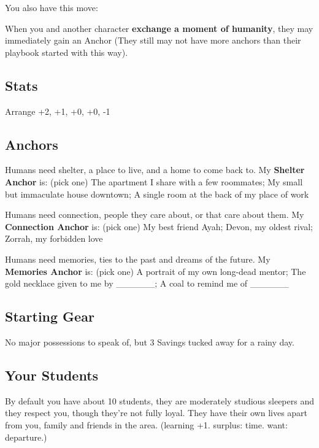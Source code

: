 \documentclass[
  oneside,
  statementpaper,
  9pt]{memoir}
\begin{document}
You also have this move:

When you and another character \textbf{exchange a moment of humanity},
they may immediately gain an Anchor (They still may not have more
anchors than their playbook started with this way).

\hypertarget{stats-4}{%
\subsection{Stats}\label{stats-4}}

Arrange +2, +1, +0, +0, -1

\hypertarget{anchors-3}{%
\subsection{Anchors}\label{anchors-3}}

Humans need shelter, a place to live, and a home to come back to. My
\textbf{Shelter Anchor} is: (pick one) The apartment I share with a few
roommates; My small but immaculate house downtown; A single room at the
back of my place of work

Humans need connection, people they care about, or that care about them.
My \textbf{Connection Anchor} is: (pick one) My best friend Ayah; Devon,
my oldest rival; Zorrah, my forbidden love

Humans need memories, ties to the past and dreams of the future. My
\textbf{Memories Anchor} is: (pick one) A portrait of my own long-dead
mentor; The gold necklace given to me by \_\_\_\_\_\_; A coal to remind
me of \_\_\_\_\_\_

\hypertarget{starting-gear-3}{%
\subsection{Starting Gear}\label{starting-gear-3}}

No major possessions to speak of, but 3 Savings tucked away for a rainy
day.

\hypertarget{your-students}{%
\subsection{Your Students}\label{your-students}}

By default you have about 10 students, they are moderately studious
sleepers and they respect you, though they're not fully loyal. They have
their own lives apart from you, family and friends in the area.
(learning +1. surplus: time. want: departure.)
\end{document}
